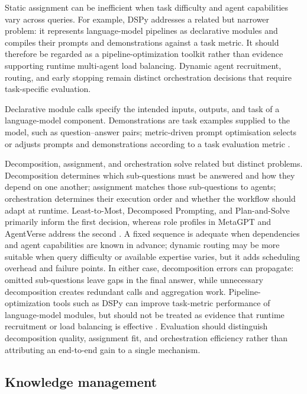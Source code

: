 \documentclass[a4paper,fleqn]{cas-dc}
\begin{document}
Static assignment can be inefficient when task difficulty and agent capabilities vary across queries. For example, DSPy \citep{khattab2024dspy} addresses a related but narrower problem: it represents language-model pipelines as declarative modules and compiles their prompts and demonstrations against a task metric. It should therefore be regarded as a pipeline-optimization toolkit rather than evidence supporting runtime multi-agent load balancing. Dynamic agent recruitment, routing, and early stopping remain distinct orchestration decisions that require task-specific evaluation.

Declarative module calls specify the intended inputs, outputs, and task of
a language-model component. Demonstrations are task examples supplied to the
model, such as question--answer pairs; metric-driven prompt optimisation
selects or adjusts prompts and demonstrations according to a task evaluation
metric \citep{khattab2024dspy}.

Decomposition, assignment, and orchestration
solve related but distinct problems. Decomposition determines which
sub-questions must be answered and how they depend on one another; assignment
matches those sub-questions to agents; orchestration determines their
execution order and whether the workflow should adapt at runtime.
Least-to-Most, Decomposed Prompting, and Plan-and-Solve primarily inform the
first decision, whereas role profiles in MetaGPT and AgentVerse address the
second \citep{zhou2023least_to_most,khot2023decomposed_prompting,
wang2023plan_and_solve,hong2024metagpt,chen2024agentverse}. A fixed sequence
is adequate when dependencies and agent capabilities are known in advance;
dynamic routing may be more suitable when query difficulty or available
expertise varies, but it adds scheduling overhead and failure points. In
either case, decomposition errors can propagate: omitted sub-questions leave
gaps in the final answer, while unnecessary decomposition creates redundant
calls and aggregation work. Pipeline-optimization tools such as DSPy can
improve task-metric performance of language-model modules, but should not be
treated as evidence that runtime recruitment or load balancing is effective
\citep{khattab2024dspy}. Evaluation should distinguish decomposition quality,
assignment fit, and orchestration efficiency rather than attributing an
end-to-end gain to a single mechanism.

\subsection{Knowledge management}
\label{sec:knowledge_management}
\end{document}
